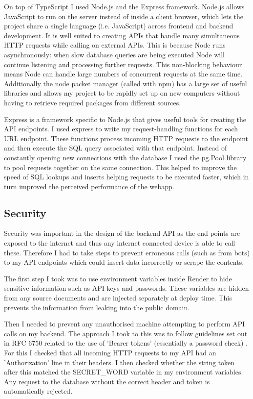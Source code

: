 On top of TypeScript I used Node.js and the Express framework. Node.js allows
JavaScript to run on the server instead of inside a client browser, which lets
the project share a single language (i.e. JavaScript) across frontend and
backend development. It is well suited to creating APIs that handle many
simultaneous HTTP requests while calling on external APIs. This is because Node
runs asynchronously: when slow database queries are being executed Node will
continue listening and processing further requests. This non-blocking behaviour
means Node can handle large numbers of concurrent requests at the same time.
Additionally the node packet manager (called with npm) has a large set of useful
libraries and allows my project to be rapidly set up on new computers without
having to retrieve required packages from different sources.

Express is a framework specific to Node.js that gives useful tools for creating
the API endpoints. I used express to write my request-handling functions for
each URL endpoint. These functions process incoming HTTP requests to the
endpoint and then execute the SQL query associated with that endpoint. Instead
of constantly opening new connections with the database I used the pg.Pool
library to pool requests together on the same connection. This helped to improve
the speed of SQL lookups and inserts helping requests to be executed faster,
which in turn improved the perceived performance of the webapp.

\subsection{Security}

Security was important in the design of the backend API as the end points are
exposed to the internet and thus any internet connected device is able to call
these. Therefore I had to take steps to prevent erroneous calls (such as from
bots) to my API endpoints which could insert data incorrectly or scrape the
contents.

The first step I took was to use environment variables inside Render to hide
sensitive information such as API keys and passwords. These variables are hidden
from any source documents and are injected separately at deploy time. This
prevents the information from leaking into the public domain.

Then I needed to prevent any unauthorised machine attempting to perform API
calls on my backend. The approach I took to this was to follow guidelines set
out in RFC 6750 related to the use of 'Bearer tokens' (essentially a password
check) \cite{rfc6750}. For this I checked that all incoming HTTP requests to my
API had an 'Authorization' line in their headers. I then checked whether the
string token after this matched the SECRET\_WORD variable in my environment
variables. Any request to the database without the correct header and token is
automatically rejected.

